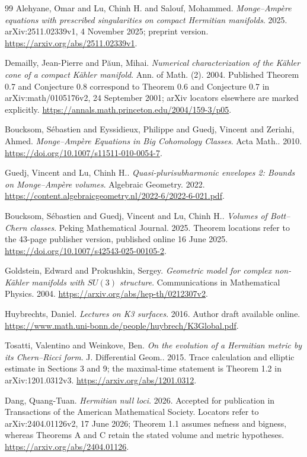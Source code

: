 \documentclass[11pt]{article}
\begin{document}
\begin{thebibliography}{99}
 Alehyane, Omar and Lu, Chinh H. and Salouf, Mohammed. \emph{{Monge--Amp\`ere} equations with prescribed singularities on compact {Hermitian} manifolds}. 2025. arXiv:2511.02339v1, 4 November 2025; preprint version. \url{https://arxiv.org/abs/2511.02339v1}.

 Demailly, Jean-Pierre and P{\u a}un, Mihai. \emph{Numerical characterization of the {K\"ahler} cone of a compact {K\"ahler} manifold}. Ann. of Math. (2). 2004. Published Theorem 0.7 and Conjecture 0.8 correspond to Theorem 0.6 and Conjecture 0.7 in arXiv:math/0105176v2, 24 September 2001; arXiv locators elsewhere are marked explicitly. \url{https://annals.math.princeton.edu/2004/159-3/p05}.

 Boucksom, S\'ebastien and Eyssidieux, Philippe and Guedj,                   Vincent and Zeriahi, Ahmed. \emph{Monge--{A}mp\`ere Equations in Big Cohomology Classes}. Acta Math.. 2010. \url{https://doi.org/10.1007/s11511-010-0054-7}.

 Guedj, Vincent and Lu, Chinh H.. \emph{Quasi-plurisubharmonic envelopes 2: Bounds on {Monge--Amp\`ere} volumes}. Algebraic Geometry. 2022. \url{https://content.algebraicgeometry.nl/2022-6/2022-6-021.pdf}.

 Boucksom, S{\'e}bastien and Guedj, Vincent and Lu, Chinh H.. \emph{Volumes of {Bott--Chern} classes}. Peking Mathematical Journal. 2025. Theorem locations refer to the 43-page publisher version, published online 16 June 2025. \url{https://doi.org/10.1007/s42543-025-00105-2}.

 Goldstein, Edward and Prokushkin, Sergey. \emph{Geometric model for complex non-{K}\"ahler manifolds with {$SU(3)$} structure}. Communications in Mathematical Physics. 2004. \url{https://arxiv.org/abs/hep-th/0212307v2}.

 Huybrechts, Daniel. \emph{Lectures on {K3} surfaces}. 2016. Author draft available online. \url{https://www.math.uni-bonn.de/people/huybrech/K3Global.pdf}.

 Tosatti, Valentino and Weinkove, Ben. \emph{On the evolution of a {Hermitian} metric by its {Chern--Ricci} form}. J. Differential Geom.. 2015. Trace calculation and elliptic estimate in Sections 3 and 9; the maximal-time statement is Theorem 1.2 in arXiv:1201.0312v3. \url{https://arxiv.org/abs/1201.0312}.

 Dang, Quang-Tuan. \emph{Hermitian null loci}. 2026. Accepted for publication in Transactions of the American Mathematical Society. Locators refer to arXiv:2404.01126v2, 17 June 2026; Theorem 1.1 assumes nefness and bigness, whereas Theorems A and C retain the stated volume and metric hypotheses. \url{https://arxiv.org/abs/2404.01126}.


\end{thebibliography}
\end{document}
